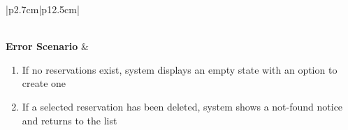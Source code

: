 \begin{table}[H]
\begin{tabular}{|p{2.7cm}|p{12.5cm}|}
\begin{minipage}[t]{\linewidth}
                                      \end{minipage}                                                                    \\
            \hline
            \textbf{Error Scenario} & \begin{minipage}[t]{\linewidth}
                                          \begin{enumerate}[topsep=0pt,itemsep=1pt,parsep=0pt,partopsep=0pt]
                                              \item If no reservations exist, system displays an empty state with an option to
                                                    create one
                                              \item If a selected reservation has been deleted, system shows a not-found notice and
                                                    returns to the list
                                          \end{enumerate}
                                      \end{minipage}                                                                  \\
            \hline
        \end{tabular}
        \label{tab:eng-browse-reservations}
    \end{table}
